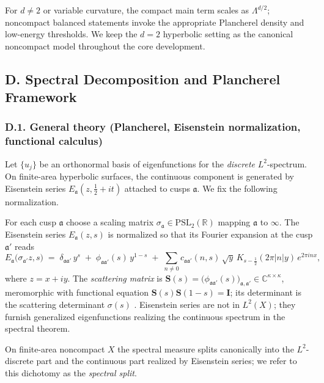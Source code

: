 \begin{remark}
For $d\ne 2$ or variable curvature, the compact main term scales as $\Lambda^{d/2}$;
noncompact balanced statements invoke the appropriate Plancherel density and low-energy thresholds.
We keep the $d=2$ hyperbolic setting as the canonical noncompact model throughout the core development.
\end{remark}

\subsection*{D. Spectral Decomposition and Plancherel Framework}
\label{subsec:spectral-decomposition}

\subsubsection*{D.1. General theory (Plancherel, Eisenstein normalization, functional calculus)}
Let $\{u_j\}$ be an orthonormal basis of eigenfunctions for the \emph{discrete} $L^2$-spectrum.
On finite-area hyperbolic surfaces, the continuous component is generated by Eisenstein series
$E_{\mathfrak{a}}(z,\tfrac12+it)$ attached to cusps $\mathfrak{a}$. We fix the following normalization.

\begin{remark}
For each cusp $\mathfrak a$ choose a scaling matrix $\sigma_{\mathfrak a}\in \mathrm{PSL}_2(\mathbb{R})$ mapping $\mathfrak a$ to $\infty$.
The Eisenstein series $E_{\mathfrak a}(z,s)$ is normalized so that its Fourier expansion at the cusp $\mathfrak a'$ reads
\[
  E_{\mathfrak a}\!\big(\sigma_{\mathfrak a'}z,s\big)
  \;=\;
  \delta_{\mathfrak a\mathfrak a'}\,y^s
  \;+\;
  \phi_{\mathfrak a\mathfrak a'}(s)\,y^{1-s}
  \;+\;
  \sum_{n\neq 0} c_{\mathfrak a\mathfrak a'}(n,s)\,\sqrt{y}\,K_{s-\frac12}(2\pi|n|y)\,e^{2\pi i n x},
\]
where $z=x+iy$. The \emph{scattering matrix} is
$\mathbf S(s)=\big(\phi_{\mathfrak a\mathfrak a'}(s)\big)_{\mathfrak a,\mathfrak a'}\in\mathbb C^{\kappa\times\kappa}$,
meromorphic with functional equation $\mathbf S(s)\mathbf S(1-s)=\mathbf I$; its determinant is the scattering determinant $\sigma(s)$ \cite{Hejhal1983II,LaxPhillips1976}.
Eisenstein series are not in $L^2(X)$; they furnish generalized eigenfunctions realizing the continuous spectrum in the spectral theorem.
\end{remark}

\begin{definition}
On finite-area noncompact $X$ the spectral measure splits canonically into the $L^2$-discrete part and the continuous
part realized by Eisenstein series; we refer to this dichotomy as the \emph{spectral split}.
\end{definition}

